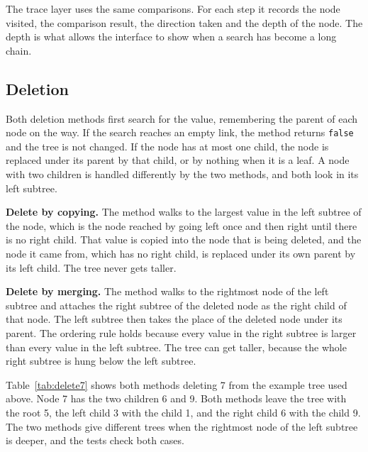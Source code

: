 The trace layer uses the same comparisons. For each step it records the node visited, the comparison result, the direction taken and the depth of the node. The depth is what allows the interface to show when a search has become a long chain.

\subsection{Deletion}
Both deletion methods first search for the value, remembering the parent of each node on the way. If the search reaches an empty link, the method returns \texttt{false} and the tree is not changed. If the node has at most one child, the node is replaced under its parent by that child, or by nothing when it is a leaf. A node with two children is handled differently by the two methods, and both look in its left subtree.

\textbf{Delete by copying.} The method walks to the largest value in the left subtree of the node, which is the node reached by going left once and then right until there is no right child. That value is copied into the node that is being deleted, and the node it came from, which has no right child, is replaced under its own parent by its left child. The tree never gets taller.

\textbf{Delete by merging.} The method walks to the rightmost node of the left subtree and attaches the right subtree of the deleted node as the right child of that node. The left subtree then takes the place of the deleted node under its parent. The ordering rule holds because every value in the right subtree is larger than every value in the left subtree. The tree can get taller, because the whole right subtree is hung below the left subtree.

Table~\ref{tab:delete7} shows both methods deleting 7 from the example tree used above. Node 7 has the two children 6 and 9. Both methods leave the tree with the root 5, the left child 3 with the child 1, and the right child 6 with the child 9. The two methods give different trees when the rightmost node of the left subtree is deeper, and the tests check both cases.

